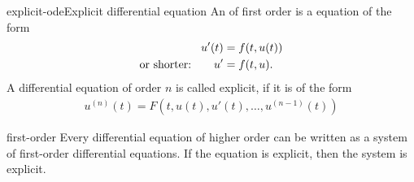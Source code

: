 \begin{Definition}{explicit-ode}{Explicit differential equation}
   An  of first order is a equation of the form
  \begin{align}
    \label{eq:IVP:ode}
    u'(t) &= f(t,u(t))\\
    \text{or shorter:}\qquad u'&=f(t,u). \notag
  \end{align}
  A differential equation of order $n$ is called explicit, if it is of
  the form
  \begin{gather*}
    u^{(n)}(t) = F\left(t, u(t), u'(t), \ldots, u^{(n-1)}(t)\right)
  \end{gather*}
\end{Definition}

\begin{Lemma}{first-order}
  Every differential equation of higher order can be written as a
  system of first-order differential equations. If the equation is
  explicit, then the system is explicit.
\end{Lemma}

